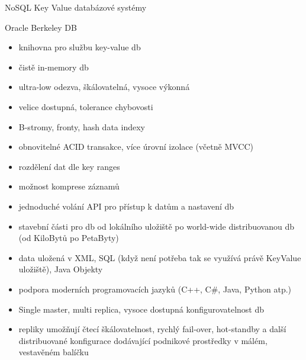 \documentclass{article}
\begin{document}
\begin{section}{NoSQL Key Value databázové systémy}
		\begin{subsection}{Oracle Berkeley DB}
			\begin{itemize}
				\item knihovna pro službu key-value db
				\item čistě in-memory db
				\item ultra-low odezva, škálovatelná, vysoce výkonná
				\item velice dostupná, tolerance chybovosti
				\item B-stromy, fronty, hash data indexy
				\item obnovitelné ACID transakce, více úrovní izolace (včetně MVCC)
				\item rozdělení dat dle key ranges
				\item možnost komprese záznamů
				\item jednoduché volání API pro přístup k datům a nastavení db
				\item stavební části pro  db od lokálního uložiště po world-wide distribuovanou db (od KiloBytů po PetaByty)
				\item data uložená v XML, SQL (když není potřeba tak se využívá právě KeyValue uložiště), Java Objekty
				\item podpora moderních programovacích jazyků (C++, C\#, Java, Python atp.)
				\item Single master, multi replica, vysoce dostupná konfigurovatelnost db
				\item repliky umožňují čtecí škálovatelnost, rychlý fail-over, hot-standby a další distribuované konfigurace dodávající podnikové prostředky v málém, vestavěném balíčku
			\end{itemize}
		\end{subsection}
		

\end{section}
\end{document}
